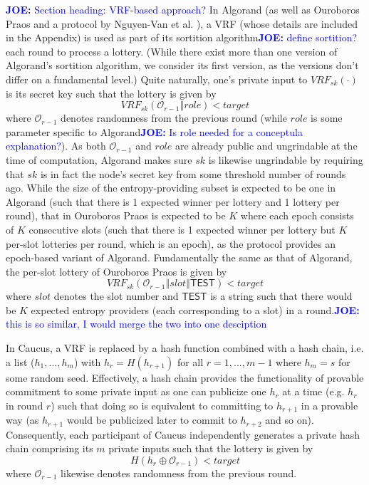 \documentclass[letterpaper,twocolumn,10pt]{article}
\theoremstyle{definition}
\theoremstyle{remark}
\newcommand{\joenote}[1]{\textcolor{blue}{\textbf{JOE:} #1}}
\begin{document}
\joenote{Section heading: VRF-based approach?}
In Algorand \cite{gilad2017algorand} (as well as Ouroboros Praos \cite{david2018ouroboros} and a protocol by Nguyen-Van et al. \cite{nguyen2019scalable}), a VRF (whose details are included in the Appendix) is used as part of its sortition algorithm\joenote{define sortition?} each round to process a lottery. (While there exist more than one version of Algorand's sortition algorithm, we consider its first version, as the versions don't differ on a fundamental level.) Quite naturally, one's private input to $VRF_{sk}(\cdot)$ is its secret key such that the lottery is given by
\[
VRF_{sk}(\mathcal{O}_{r - 1} \mathbin\Vert role) < target
\]
where $\mathcal{O}_{r - 1}$ denotes randomness from the previous round (while $role$ is some parameter specific to Algorand\joenote{Is role needed for a conceptula explanation?}). As both $\mathcal{O}_{r - 1}$ and $role$ are already public and ungrindable at the time of computation, Algorand makes sure $sk$ is likewise ungrindable by requiring that $sk$ is in fact the node's secret key from some threshold number of rounds ago. While the size of the entropy-providing subset is expected to be one in Algorand (such that there is 1 expected winner per lottery and 1 lottery per round), that in Ouroboros Praos is expected to be $K$ where each epoch consists of $K$ consecutive slots (such that there is 1 expected winner per lottery but $K$ per-slot lotteries per round, which is an epoch), as the protocol provides an epoch-based variant of Algorand. Fundamentally the same as that of Algorand, the per-slot lottery of Ouroboros Praos is given by
\[
VRF_{sk}(\mathcal{O}_{r - 1} \mathbin\Vert slot \mathbin\Vert \mathsf{TEST}) < target
\]
where $slot$ denotes the slot number and $\mathsf{TEST}$ is a string such that there would be $K$ expected entropy providers (each corresponding to a slot) in a round.\joenote{this is so similar, I would merge the two into one desciption}

In Caucus, a VRF is replaced by a hash function combined with a hash chain, i.e. a list ($h_1, ..., h_m$) with $h_r = H(h_{r + 1})$ for all $r = 1, ..., m - 1$ where $h_m = s$ for some random seed. Effectively, a hash chain provides the functionality of provable commitment to some private input as one can publicize one $h_r$ at a time (e.g. $h_r$ in round $r$) such that doing so is equivalent to committing to $h_{r + 1}$ in a provable way (as $h_{r + 1}$ would be publicized later to commit to $h_{r + 2}$ and so on). Consequently, each participant of Caucus independently generates a private hash chain comprising its $m$ private inputs such that the lottery is given by
\[
H(h_r \oplus \mathcal{O}_{r - 1}) < target
\]
where $\mathcal{O}_{r - 1}$ likewise denotes randomness from the previous round.
\end{document}
